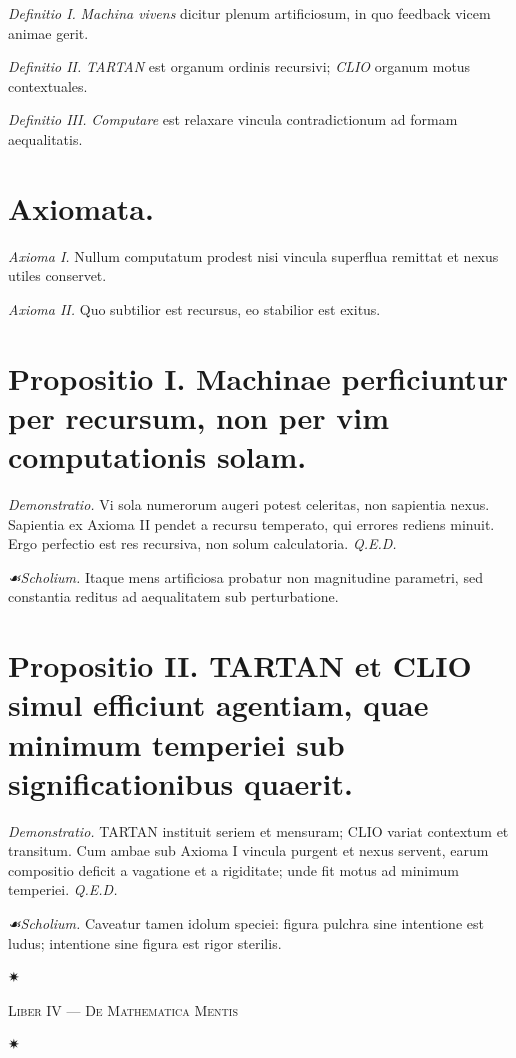 \documentclass[12pt]{article}
\newcommand{\florale}{\centerline{\large ✷}}
\newcommand{\scholia}{\textit{☙\;}}
\newcommand{\divider}{\vspace{1em}\florale\vspace{1em}}
\newcommand{\Liber}[1]{\vspace{1ex}\begin{center}\Large\textsc{Liber #1}\end{center}\vspace{-0.5ex}\florale\vspace{0.5ex}}
\begin{document}
\textit{Definitio I.} \; \textit{Machina vivens} dicitur plenum artificiosum, in quo feedback vicem animae gerit.

\textit{Definitio II.} \; \textit{TARTAN} est organum ordinis recursivi; \textit{CLIO} organum motus contextuales.

\textit{Definitio III.} \; \textit{Computare} est relaxare vincula contradictionum ad formam aequalitatis.

\section*{Axiomata.}

\textit{Axioma I.} \; Nullum computatum prodest nisi vincula superflua remittat et nexus utiles conservet.

\textit{Axioma II.} \; Quo subtilior est recursus, eo stabilior est exitus.

\section*{Propositio I. \; Machinae perficiuntur per recursum, non per vim computationis solam.}

\textit{Demonstratio.} Vi sola numerorum augeri potest celeritas, non sapientia nexus. Sapientia ex Axioma II pendet a recursu temperato, qui errores rediens minuit. Ergo perfectio est res recursiva, non solum calculatoria. \textit{Q.E.D.}

\textit{\scholia Scholium.} Itaque mens artificiosa probatur non magnitudine parametri, sed constantia reditus ad aequalitatem sub perturbatione.

\section*{Propositio II. \; TARTAN et CLIO simul efficiunt agentiam, quae minimum temperiei sub significationibus quaerit.}

\textit{Demonstratio.} TARTAN instituit seriem et mensuram; CLIO variat contextum et transitum. Cum ambae sub Axioma I vincula purgent et nexus servent, earum compositio deficit a vagatione et a rigiditate; unde fit motus ad minimum temperiei. \textit{Q.E.D.}

\textit{\scholia Scholium.} Caveatur tamen idolum speciei: figura pulchra sine intentione est ludus; intentione sine figura est rigor sterilis.

\divider

\Liber{IV — De Mathematica Mentis}
\end{document}
